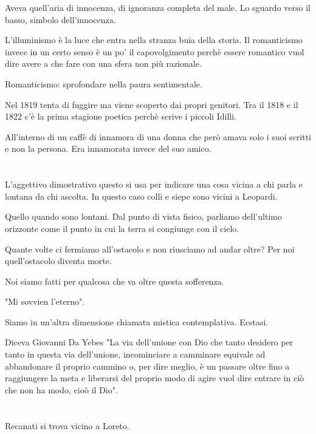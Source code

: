 \documentclass{article}
\begin{document}
    Aveva quell'aria di innocenza, di ignoranza completa del male.
    Lo sguardo verso il basso, simbolo dell'innocenza.

    L'illuminismo è la luce che entra nella stranza buia della storia. Il romanticismo invece in un certo senso è un po' il capovolgimento perchè essere romantico vuol dire avere a che fare con una sfera non più razionale.

    Romanticismo: sprofondare nella paura sentimentale.

    Nel 1819 tenta di fuggire ma viene scoperto dai propri genitori. Tra il 1818 e il 1822 c'è la prima stagione poetica perchè scrive i piccoli Idilli.

    All'interno di un caffè di innamora di una donna che però amava solo i suoi scritti e non la persona. Era innamorata invece del suo amico.

    \section{}
    
    L'aggettivo dimostrativo questo si usa per indicare una cosa vicina a chi parla e lontana da chi ascolta. In questo caso colli e siepe sono vicini a Leopardi.

    Quello quando sono lontani.
    Dal punto di vista fisico, parliamo dell'ultimo orizzonte come il punto in cui la terra si congiunge con il cielo.

    Quante volte ci fermiamo all'ostacolo e non riusciamo ad andar oltre? Per noi quell'ostacolo diventa morte.
    
    Noi siamo fatti per qualcosa che va oltre questa sofferenza.

    "Mi sovvien l'eterno".

    Siamo in un'altra dimensione chiamata mistica contemplativa. Ecstasi.

    Diceva Giovanni Da Yebes "La via dell'unione con Dio che tanto desidero per tanto in questa via dell'unione, incominciare a camminare equivale ad abbandonare il proprio cammino o, per dire meglio, è un passare oltre fino a raggiungere la meta e liberarsi del proprio modo di agire vuol dire entrare in ciò che non ha modo, cioò il Dio".

    \section{}

    Recanati si trova vicino a Loreto.
\end{document}
